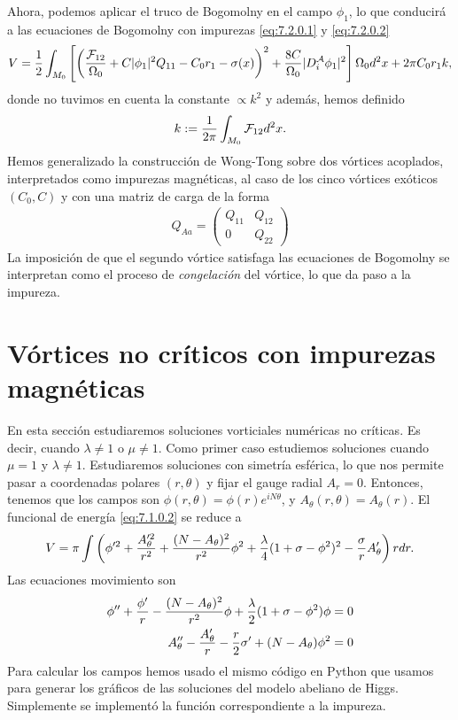 Ahora, podemos aplicar el truco de Bogomolny en el campo $\phi_1$, lo que conducirá a las ecuaciones de Bogomolny con impurezas \eqref{eq:7.2.0.1} y \eqref{eq:7.2.0.2}
\begin{align}
	V = \frac{1}{2}\int_{M_0}\left[\left(\frac{\mathcal{F}_{12}}{\Omega_0}+C|\phi_1|^2Q_{11}-C_0r_1-\sigma(x)\right)^2+\frac{8C}{\Omega_0}|D_i^{\mathcal{A}}\phi_1|^2\right]\Omega_0 d^2x+2\pi C_0r_1 k,
\end{align}
donde no tuvimos en cuenta la constante $\propto k^2$ y además, hemos definido
\begin{align}
	k:=\frac{1}{2\pi}\int_{M_0}\mathcal{F}_{12} d^2x.
\end{align}
Hemos generalizado la construcción de Wong-Tong sobre dos vórtices acoplados, interpretados como impurezas magnéticas, al caso de los cinco vórtices exóticos $(C_0,C)$ y con una matriz de carga de la forma
\begin{align}
	Q_{Aa} = \begin{pmatrix}
		Q_{11} & Q_{12} \\
		0      & Q_{22}
	\end{pmatrix}
\end{align}
La imposición de que el segundo vórtice satisfaga las ecuaciones de Bogomolny se interpretan como el proceso de \emph{congelación} del vórtice, lo que da paso a la impureza.

\newpage

\section{Vórtices no críticos con impurezas magnéticas}

En esta sección estudiaremos soluciones vorticiales numéricas no críticas. Es decir, cuando $\lambda\neq 1$ o $\mu\neq 1$. Como primer caso estudiemos soluciones cuando $\mu=1$ y $\lambda\neq 1$. Estudiaremos soluciones con simetría esférica, lo que nos permite pasar a coordenadas polares $(r,\theta)$ y fijar el gauge radial $A_r =0$. Entonces, tenemos que los campos son $\phi(r,\theta)=\phi(r)e^{iN\theta}$, y $A_\theta(r,\theta)=A_\theta(r)$. El funcional de energía \eqref{eq:7.1.0.2} se reduce a
\begin{align}
	V = \pi\int\left(\phi'^2+\frac{A_\theta'^2}{r^2}+\frac{(N-A_\theta)^2}{r^2}\phi^2+\frac{\lambda}{4}(1+\sigma-\phi^2)^2-\frac{\sigma}{r}A_\theta'\right)rdr. \label{eq:7.4.0.1}
\end{align}
Las ecuaciones movimiento son
\begin{align}
	\phi''+\frac{\phi'}{r}-\frac{(N-A_\theta)^2}{r^2}\phi+\frac{\lambda}{2}(1+\sigma-\phi^2)\phi & =0  \\
	A_\theta''-\frac{A_\theta'}{r}-\frac{r}{2}\sigma'+(N-A_\theta)\phi^2                      & = 0
\end{align}
Para calcular los campos hemos usado el mismo código en Python que usamos para generar los gráficos de las soluciones del modelo abeliano de Higgs. Simplemente se implementó la función correspondiente a la impureza.

